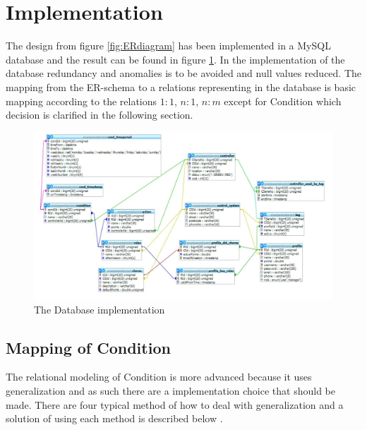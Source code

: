 \section{Implementation}

The design from figure \ref{fig:ERdiagram} has been implemented in a MySQL database and the result can be found in figure \ref{fig:databaseDiagram}. In the implementation of the database redundancy and anomalies is to be avoided and null values reduced. 
The mapping from the ER-schema to a relations representing in the database is basic mapping according to the relations $1:1$, $n:1$, $n:m$ except for Condition which decision is clarified in the following section\citep{DatabaseKilde}. 

\begin{figure}
	\centering
		\includegraphics[width=1.00\textwidth]{images/databaseDiagram.jpg}
	\caption{The Database implementation}
	\label{fig:databaseDiagram}
\end{figure}

\subsection{Mapping of Condition}
\label{subsec:mappRule}
The relational modeling of Condition is more advanced because it uses generalization and as such there are a implementation choice that should be made. There are four typical method of how to deal with generalization and a solution of using each method is described below \citep{DatabaseKilde}.

